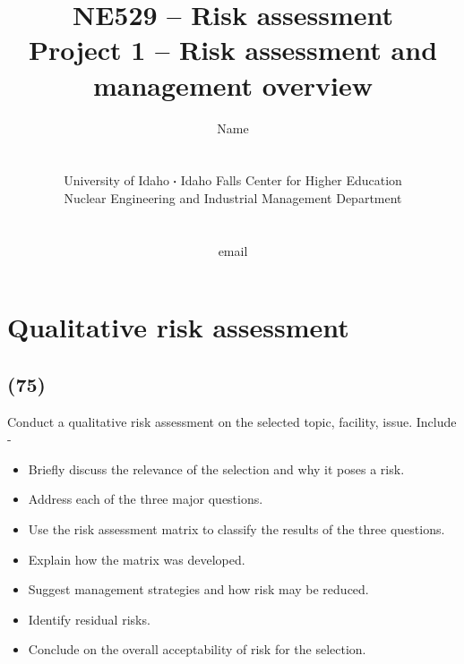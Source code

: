\documentclass[11pt,a4paper]{article}
\newcommand*\sq{\mathbin{\vcenter{\hbox{\rule{.3ex}{.3ex}}}}} %
\begin{document}
\begin{titlepage}
    \title{
        NE529 -- Risk assessment\\
        Project 1 -- Risk assessment and management overview\\
    }
    \author{
        Name
        \\ \\ \\
        University of Idaho $\sq$ Idaho Falls Center for Higher Education\\
        Nuclear Engineering and Industrial Management Department
        \\ \\ \\
        email 
    }
\clearpage %
\maketitle
\vspace*{\fill}
\thispagestyle{empty} %
\end{titlepage}


\section{Qualitative risk assessment}
\subsection*{(75)}
Conduct a qualitative risk assessment on the selected topic, facility, issue. Include - 
\begin{itemize}
    \item Briefly discuss the relevance of the selection and why it poses a risk.
    \item Address each of the three major questions.
    \item Use the risk assessment matrix to classify the results of the three questions.
    \item Explain how the matrix was developed.
    \item Suggest management strategies and how risk may be reduced.
    \item Identify residual risks.
    \item Conclude on the overall acceptability of risk for the selection.
\end{itemize}
\end{document}
